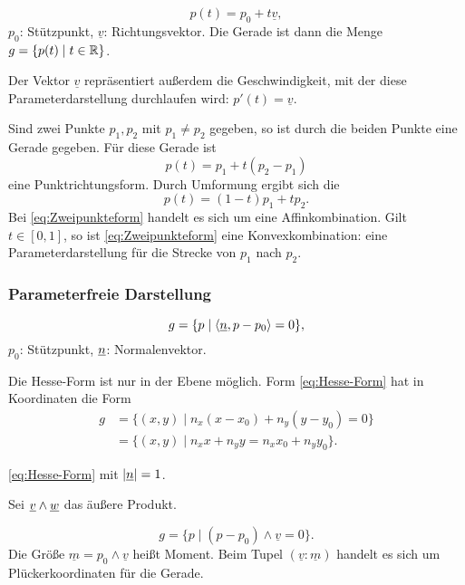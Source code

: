 \begin{equation}
p(t) = p_0+t\underline v,
\end{equation}
$p_0$: Stützpunkt, $\underline v$: Richtungsvektor.
Die Gerade ist dann die Menge $g=\{p(t)\mid t\in\mathbb R\}$.

Der Vektor $\underline v$ repräsentiert außerdem die Geschwindigkeit,
mit der diese Parameterdarstellung durchlaufen wird:
$p'(t)=\underline v$.

Sind zwei Punkte $p_1,p_2$ mit $p_1\ne p_2$ gegeben, so ist
durch die beiden Punkte eine Gerade gegeben. Für diese Gerade ist
\begin{equation}
p(t) = p_1+t(p_2-p_1)
\end{equation}
eine Punktrichtungsform.
Durch Umformung ergibt sich die 
\begin{equation}\label{eq:Zweipunkteform}
p(t) = (1-t)p_1+tp_2.
\end{equation}
Bei \eqref{eq:Zweipunkteform} handelt es sich um eine
Affinkombination. Gilt $t\in[0,1]$, so ist \eqref{eq:Zweipunkteform}
eine Konvexkombination: eine Parameterdarstellung für die Strecke
von $p_1$ nach $p_2$.

\subsubsection{Parameterfreie Darstellung}
\begin{equation}\label{eq:Hesse-Form}
g = \{p\mid\langle \underline{n},p-p_0\rangle = 0\},
\end{equation}
$p_0$: Stützpunkt, $\underline{n}$: Normalenvektor.

Die Hesse-Form ist nur in der Ebene möglich.
Form \eqref{eq:Hesse-Form} hat in Koordinaten
die Form
\begin{equation}
\begin{split}
g &= \{(x,y)\mid n_x(x-x_0)+n_y(y-y_0)=0\}\\
&= \{(x,y)\mid n_x x+n_y y = n_x x_0+n_y y_0\}.
\end{split}
\end{equation}

 \eqref{eq:Hesse-Form} mit $|\underline{n}|=1$.


Sei $\underline{v}\wedge\underline{w}$ das äußere Produkt.

\begin{equation}
g = \{p\mid (p-p_0)\wedge \underline v=0\}.
\end{equation}
Die Größe $\underline m = p_0\wedge\underline v$ heißt Moment.
Beim Tupel $(\underline v:\underline m)$ handelt es sich um
Plückerkoordinaten für die Gerade.

